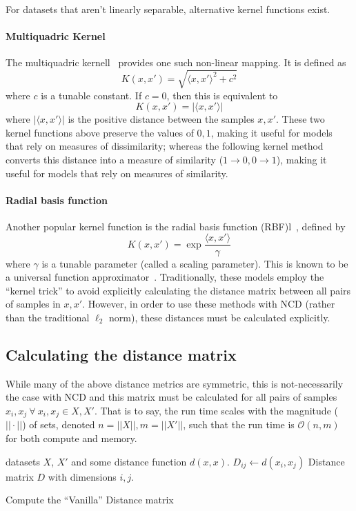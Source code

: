 \documentclass[conference]{IEEEtran}
\begin{document}
For datasets that aren't linearly separable, alternative kernel functions exist. 

\paragraph{Multiquadric Kernel}
\label{multiquadric_kernel}
The multiquadric kernell~\cite{kernels} provides one such non-linear mapping. 
It is defined as 
$$
K(x, x') = \sqrt{\langle x, x' \rangle ^2 + c^2}
$$
where $c$ is a tunable constant. 
If $c=0$, then this is equivalent to
$$
K(x, x') = | \langle x, x' \rangle|
$$
where $| \langle x, x' \rangle |$ is the positive distance between the samples $x, x'$. 
These two kernel functions above preserve the values of $0,1$, making it useful for models that rely on measures of dissimilarity; whereas the following kernel method converts this distance into a measure of similarity ($1 \rightarrow 0, 0 \rightarrow 1$), making it useful for models that rely on measures of similarity.

\paragraph{Radial basis function}
\label{rbf_kernel}
Another popular kernel function is the radial basis function (RBF)l~\cite{kernels}, defined by
$$
K(x, x') = \exp{\frac{\langle x, x' \rangle}{\gamma}}
$$
where $\gamma$ is a tunable parameter (called a scaling parameter). 
This is known to be a universal function approximator~\cite{}. 
Traditionally, these models employ the ``kernel trick'' to avoid explicitly calculating the distance matrix between all pairs of samples in $x,x'$. 
However, in order to use these methods with NCD (rather than the traditional $\ell_2$ norm), these distances must be calculated explicitly. 

\subsection{Calculating the distance matrix}
\label{gram_matrix}
While many of the above distance metrics are symmetric, this is not-necessarily the case with NCD and this matrix must be calculated for all pairs of samples $x_i, x_j~\forall~x_i,x_j \in X, X'$. 
That is to say, the run time scales with the magnitude ($ || \cdot || $) of sets, denoted $n = || X ||, m = || X' ||$, such that the run time is $\mathcal{O}(n,m)$ for both compute and memory.
\begin{algorithm}
    \begin{algorithmic}
        \Require datasets $X$, $X'$ and some distance function $d(x,x)$.
                \State $D_{ij} \gets d(x_i, x_j)$
            \EndFor
        \EndFor
        \State \Return Distance matrix $D$ with dimensions $i,j$.
    \end{algorithmic}
    \caption{Compute the ``Vanilla'' Distance matrix}
    \label{alg:vanilla}
\end{algorithm}
\end{document}
